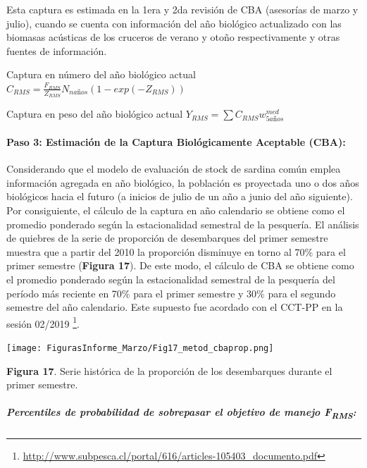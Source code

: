 \documentclass[
  spanish,
]{article}
\begin{document}
Esta captura es estimada en la 1era y 2da revisión de CBA (asesorías de
marzo y julio), cuando se cuenta con información del año biológico
actualizado con las biomasas acústicas de los cruceros de verano y otoño
respectivamente y otras fuentes de información.

Captura en número del año biológico actual
\(C_{RMS}=\frac{F_{RMS}}{Z_{RMS}} N_{naños}(1-exp(-Z_{RMS}))\)

Captura en peso del año biológico actual
\(Y_{RMS}=\sum{C_{RMS} w_{5años}^{med}}\)

\hypertarget{paso-3-estimaciuxf3n-de-la-captura-bioluxf3gicamente-aceptable-cba}{%
\paragraph{Paso 3: Estimación de la Captura Biológicamente Aceptable
(CBA):}\label{paso-3-estimaciuxf3n-de-la-captura-bioluxf3gicamente-aceptable-cba}}

Considerando que el modelo de evaluación de stock de sardina común
emplea información agregada en año biológico, la población es proyectada
uno o dos años biológicos hacia el futuro (a inicios de julio de un año
a junio del año siguiente). Por consiguiente, el cálculo de la captura
en año calendario se obtiene como el promedio ponderado según la
estacionalidad semestral de la pesquería. El análisis de quiebres de la
serie de proporción de desembarques del primer semestre muestra que a
partir del 2010 la proporción disminuye en torno al 70\% para el primer
semestre (\textbf{Figura 17}). De este modo, el cálculo de CBA se
obtiene como el promedio ponderado según la estacionalidad semestral de
la pesquería del período más reciente en 70\% para el primer semestre y
30\% para el segundo semestre del año calendario. Este supuesto fue
acordado con el CCT-PP en la sesión 02/2019 \footnote{\url{http://www.subpesca.cl/portal/616/articles-105403_documento.pdf}}.

\begin{center}
\texttt{[image: FigurasInforme\_Marzo/Fig17\_metod\_cbaprop.png]}
\end{center}

\small

\textbf{Figura 17}. Serie histórica de la proporción de los desembarques
durante el primer semestre.

\vspace{0.5cm} \normalsize

\hypertarget{percentiles-de-probabilidad-de-sobrepasar-el-objetivo-de-manejo-frms}{%
\subparagraph{\texorpdfstring{Percentiles de probabilidad de sobrepasar
el objetivo de manejo
F\textsubscript{RMS}:}{Percentiles de probabilidad de sobrepasar el objetivo de manejo FRMS:}}\label{percentiles-de-probabilidad-de-sobrepasar-el-objetivo-de-manejo-frms}}
\end{document}
